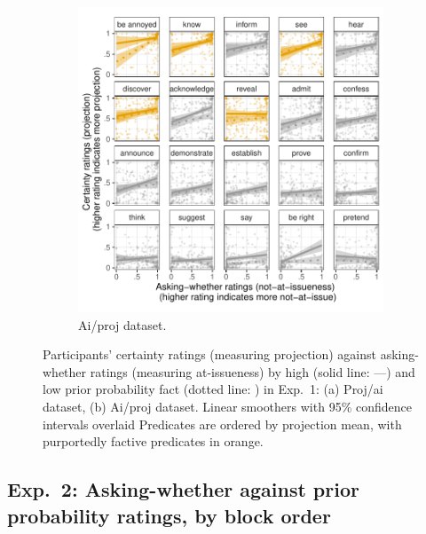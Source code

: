 \documentclass[11pt,fleqn]{article}
\newcommand{\6}{\mbox{$[\hspace*{-.6mm}[$}}
\newcommand{\9}{\mbox{$]\hspace*{-.6mm}]$}}
\begin{document}
\begin{figure}[h!]
\begin{subfigure}[t]{0.49\textwidth}
\includegraphics[width=.9\textwidth]{../../results/exp2/graphs/SUP-aiproj-projection-by-ai-and-prior}
\caption{Ai/proj dataset.}
 \end{subfigure}
 
  
\caption{Participants' certainty ratings (measuring projection) against asking-whether ratings (measuring at-issueness) by high (solid line: ---) and low prior probability fact (dotted line: \raisebox{1mm}{\ldots}) in Exp.~1: (a) Proj/ai dataset, (b) Ai/proj dataset. Linear smoothers with 95\% confidence intervals overlaid Predicates are ordered by projection mean, with purportedly factive predicates in orange.}
\end{figure}

\newpage

\subsection{Exp.~2: Asking-whether against prior probability ratings, by block order}
\end{document}
